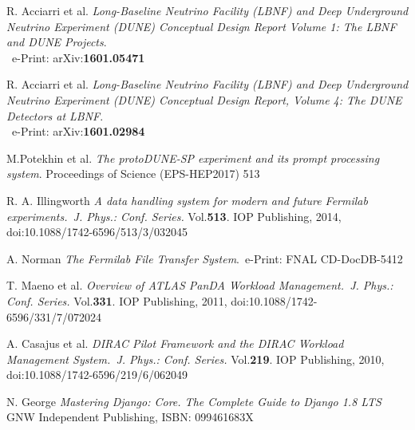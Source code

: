 \documentclass{webofc}
\begin{document}
\begin{thebibliography}{99}



R. Acciarri et al.
\emph{Long-Baseline Neutrino Facility (LBNF) and Deep Underground Neutrino Experiment (DUNE) Conceptual Design Report Volume 1: The LBNF and DUNE Projects}.\\ ~e-Print: arXiv:\textbf{1601.05471}

R. Acciarri et al.
\emph{Long-Baseline Neutrino Facility (LBNF) and Deep Underground Neutrino Experiment (DUNE) Conceptual Design Report, Volume 4: The DUNE Detectors at LBNF}.\\~e-Print: arXiv:\textbf{1601.02984}

 M.Potekhin et al. \emph{The protoDUNE-SP experiment and its prompt
processing system}. Proceedings of Science (EPS-HEP2017) 513



R. A. Illingworth \emph{A data handling system for modern and future Fermilab experiments.~J. Phys.: Conf. Series.} Vol.\textbf{513}. IOP Publishing, 2014,
doi:10.1088/1742-6596/513/3/032045

A. Norman \emph{The Fermilab File Transfer System}.~e-Print: FNAL CD-DocDB-5412



T. Maeno et al. \emph{Overview of ATLAS PanDA Workload Management.~J. Phys.: Conf. Series.} Vol.\textbf{331}. IOP Publishing, 2011,
doi:10.1088/1742-6596/331/7/072024



A. Casajus et al.  \emph{DIRAC Pilot Framework and the DIRAC
Workload Management System.~J. Phys.: Conf. Series.} Vol.\textbf{219}. IOP Publishing, 2010,
doi:10.1088/1742-6596/219/6/062049

N. George \emph{Mastering Django: Core. The Complete Guide to Django 1.8 LTS}~ GNW Independent Publishing, ISBN: 099461683X



\end{thebibliography}
\end{document}

